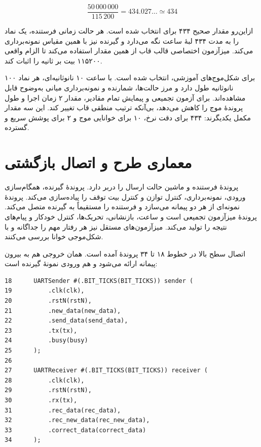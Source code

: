 \begin{equation}
\frac{50\,000\,000}{115\,200}=434.027\ldots \simeq 434
\end{equation}

ازاین‌رو مقدار صحیح ۴۳۴ برای  انتخاب شده است. هر حالت زمانی فرستنده، یک
نماد را به مدت ۴۳۴ لبهٔ ساعت نگه می‌دارد و گیرنده نیز با همین مقیاس نمونه‌برداری می‌کند.
میزآزمون اختصاصی قالب قاب از همین مقدار استفاده می‌کند تا الزام واقعی ۱۱۵۲۰۰ بیت بر
ثانیه را اثبات کند.

برای شکل‌موج‌های آموزشی،  انتخاب شده است. با ساعت ۱۰ نانوثانیه‌ای،
هر نماد ۱۰۰ نانوثانیه طول دارد و مرز حالت‌ها، شمارنده و نمونه‌برداری میانی به‌وضوح قابل
مشاهده‌اند. برای آزمون تجمیعی و پیمایش تمام مقادیر، مقدار ۲ زمان اجرا و طول پروندهٔ موج
را کاهش می‌دهد، بی‌آنکه ترتیب منطقی قاب تغییر کند. این سه مقدار مکمل یکدیگرند: ۴۳۴ برای
دقت نرخ، ۱۰ برای خوانایی موج و ۲ برای پوشش سریع و گسترده.


\section{معماری طرح و اتصال بازگشتی}

پروندهٔ  فرستنده و ماشین حالت ارسال را دربر دارد. پروندهٔ
 گیرنده، همگام‌سازی ورودی، نمونه‌برداری، کنترل توازن و کنترل بیت توقف
را پیاده‌سازی می‌کند. پروندهٔ  نمونه‌ای از هر دو پیمانه می‌سازد و
 فرستنده را مستقیماً به  گیرنده متصل می‌کند. پروندهٔ 
میزآزمون تجمیعی است و ساعت، بازنشانی، تحریک‌ها، کنترل خودکار و پیام‌های نتیجه را تولید
می‌کند. میزآزمون‌های مستقل نیز هر رفتار مهم را جداگانه و با شکل‌موجی خوانا بررسی می‌کنند.

اتصال سطح بالا در خطوط ۱۸ تا ۳۴ پروندهٔ  آمده است. همان خروجی
 هم به بیرون پیمانه ارائه می‌شود و هم ورودی  نمونهٔ گیرنده است:

\begin{dsdlcodeblock}
\begin{verbatim}
18      UARTSender #(.BIT_TICKS(BIT_TICKS)) sender (
19          .clk(clk),
20          .rstN(rstN),
21          .new_data(new_data),
22          .send_data(send_data),
23          .tx(tx),
24          .busy(busy)
25      );
26
27      UARTReceiver #(.BIT_TICKS(BIT_TICKS)) receiver (
28          .clk(clk),
29          .rstN(rstN),
30          .rx(tx),
31          .rec_data(rec_data),
32          .rec_new_data(rec_new_data),
33          .correct_data(correct_data)
34      );
\end{verbatim}
\end{dsdlcodeblock}

